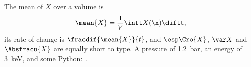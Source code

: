 \documentclass{article}
\begin{document}
The mean of \(X\) over a volume is
\[
  \mean{X} = \frac{1}{V}\intt X(\x)\diftt ,
\]
its rate of change is \(\fracdif{\mean{X}}{t}\), and
\(\esp\Cro{X}\), \(\var X\) and \(\Absfracu{X}\) are equally short to type.
A pressure of \qty{1.2}{\bar}, an energy of \qty{3}{\kilo\eV}, and
some Python: .
\end{document}
